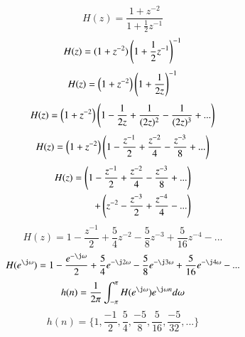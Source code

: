 \documentclass[journal,12pt,twocolumn]{IEEEtran}
\begin{document}
\begin{equation}
	H(z) = \frac{1 + z^{-2}}{1 + \frac{1}{2}z^{-1}}
\end{equation}
\begin{equation}
	H(z) = (1 + z^{-2})\left(1 + \frac{1}{2}z^{-1}\right)^{-1}
\end{equation}
\begin{equation}
	H(z) = \left(1 + z^{-2}\right)\left(1 + \frac{1}{2z}\right)^{-1}
\end{equation}
\begin{equation}
	H(z) = \left(1 + z^{-2}\right)\left(1 - \frac{1}{2z} + \frac{1}{(2z)^{2}} - \frac{1}{(2z)^{3}} + ...\right)
\end{equation}
\begin{equation}
	H(z) = \left(1 + z^{-2}\right)\left(1 - \frac{z^{-1}}{2} + \frac{z^{-2}}{4} - \frac{z^{-3}}{8} + ...\right)
\end{equation}
\begin{align*}
	H(z) = \left(1 - \frac{z^{-1}}{2} + \frac{z^{-2}}{4} - \frac{z^{-3}}{8} + ...\right) \\+ \left(z^{-2} - \frac{z^{-3}}{2} + \frac{z^{-4}}{4} - ...\right)
\end{align*}
\begin{equation}
	H(z) = 1 - \frac{z^{-1}}{2} + \frac{5}{4}z^{-2} - \frac{5}{8}z^{-3} + \frac{5}{16}z^{-4} - ...
\end{equation}
\begin{equation}
	H(e^{\j\omega}) = 1 - \frac{e^{-\j\omega}}{2} + \frac{5}{4}e^{-\j2\omega} - \frac{5}{8}e^{-\j3\omega} + \frac{5}{16}e^{-\j4\omega} - ...
\end{equation}
\begin{equation}
	h(n) = \frac{1}{2\pi}\int_{-\pi}^{\pi}H(e^{\j\omega})e^{\j\omega{n}}d\omega
\end{equation}
\begin{equation}
	\boxed{h(n) = \bigg\{1, \frac{-1}{2}, \frac{5}{4}, \frac{-5}{8}, \frac{5}{16}, \frac{-5}{32}, ...\bigg\}}
\end{equation}
\end{document}
